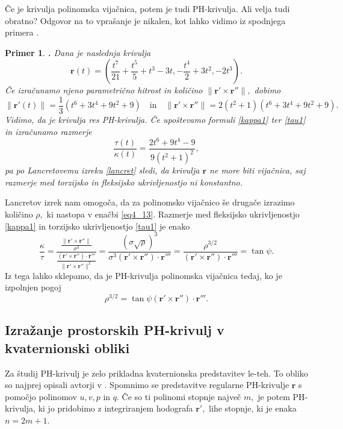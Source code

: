 \documentclass[12pt,a4paper,twoside]{article}
\theoremstyle{definition} %
\theoremstyle{plain} %
\theoremstyle{primerstyle}
\newtheorem{primer}[definicija]{Primer}
\numberwithin{equation}{section}  %
\newcommand{\fleksija}{\frac{\lVert \mathbf{r}'\times\mathbf{r}'' \rVert}{\sigma^3}}
\newcommand{\torzija}{\frac{(\mathbf{r}'\times\mathbf{r}'')\cdot\mathbf{r}'''}{\lVert \mathbf{r}'\times\mathbf{r}'' \rVert^2}}
\newcommand{\rV}{\mathbf{r}}
\begin{document}
Če je krivulja polinomska vijačnica, potem je tudi PH-krivulja. Ali velja tudi obratno? Odgovor na to vprašanje je nikalen, kot lahko vidimo iz spodnjega primera \cite[str.\ 121]{beltranmonterde}.
\begin{primer}
	\label{PH_ne_vijacnica}
	\textbf{.} Dana je naslednja krivulja
	\begin{equation*}
		\rV(t)=\left ( \frac{t^7}{21}+\frac{t^5}{5}+t^3-3t,-\frac{t^4}{2}+3t^2,-2t^3 \right)\!.
	\end{equation*}
	Če izračunamo njeno parametrično hitrost in količino $\lVert \rV' \times \rV'' \rVert,$ dobimo
	\begin{equation*}
		\lVert \rV'(t) \rVert=\frac{1}{3}(t^6+3t^4+9t^2+9) \quad \text{in} \quad \lVert \rV' \times \rV'' \rVert=2(t^2+1)(t^6+3t^4+9t^2+9).
	\end{equation*}
	Vidimo, da je krivulja res PH-krivulja. Če upoštevamo formuli \eqref{kappa1} ter \eqref{tau1} in izračunamo razmerje
	\begin{equation*}
		\frac{\tau(t)}{\kappa(t)}=\frac{2t^6+9t^4-9}{9(t^2+1)^2},
	\end{equation*}
	pa po Lancretovemu izreku \ref{lancret} sledi, da krivulja $\rV$ ne more biti vijačnica, saj razmerje med torzijsko in fleksijsko ukrivljenostjo ni konstantno.
\end{primer}

Lancretov izrek nam omogoča, da za polinomsko vijačnico še drugače izrazimo količino $\rho,$ ki nastopa v enačbi \eqref{eq4_13}. Razmerje med fleksijsko ukrivljenostjo \eqref{kappa1} in torzijsko ukrivljenostjo \eqref{tau1} je enako
\begin{equation}
	\label{rho3over2}
	\frac{\kappa}{\tau}=\frac{\fleksija}{\torzija}=\frac{(\sigma \sqrt{\rho})^3}{\sigma^3(\rV'\times\rV'')\cdot\rV'''}=\frac{\rho^{3/2}}{(\rV'\times\rV'')\cdot\rV'''}=\tan \psi.
\end{equation}
Iz tega lahko sklepamo, da je PH-krivulja polinomska vijačnica tedaj, ko je izpolnjen pogoj
\begin{equation}
	\label{rho_helix_pogoj}
	\rho^{3/2}=\tan \psi (\rV'\times\rV'')\cdot\rV'''.
\end{equation}

\subsection{Izražanje prostorskih PH-krivulj v kvaternionski obliki}
\label{PH_kvaternioni}

Za študij PH-krivulj je zelo prikladna kvaternionska predstavitev le-teh. To obliko so najprej opisali avtorji v \cite{choi2002clifford}. Spomnimo se predstavitve regularne PH-krivulje $\rV$ s pomočjo polinomov $u,v,p$ in $q.$ Če so ti polinomi stopnje največ $m,$ je potem PH-krivulja, ki jo pridobimo z integriranjem hodografa $\rV',$ lihe stopnje, ki je enaka $n=2m+1.$
\end{document}
